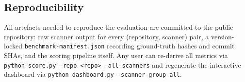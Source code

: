 \subsection{Reproducibility}
\label{sec:reproducibility}

All artefacts needed to reproduce the evaluation are committed to the public repository: raw scanner output for every (repository, scanner) pair, a version-locked \texttt{benchmark-manifest.json} recording ground-truth hashes and commit SHAs, and the scoring pipeline itself. Any user can re-derive all metrics via \texttt{python score.py --repo <repo> --all-scanners} and regenerate the interactive dashboard via \texttt{python dashboard.py --scanner-group all}.
